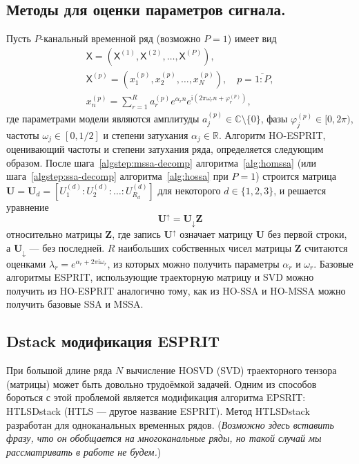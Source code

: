 \documentclass[12pt]{article}
\newcommand{\tX}{\mathsf{X}}
\newcommand{\iu}{\mathrm{i}}
\theoremstyle{definition}
\theoremstyle{remark}
\begin{document}
\subsection{Методы для оценки параметров сигнала.}
Пусть $P$-канальный временной ряд (возможно $P=1$) имеет вид
\begin{gather*}
  \tX = (\tX^{(1)}, \tX^{(2)}, \ldots, \tX^{(P)}),\\
  \tX^{(p)} = (x_1^{(p)}, x_2^{(p)}, \ldots, x_N^{(p)}), \quad
  p=\overline{1:P},\\
  x_n^{(p)}= \sum_{r=1}^{R} a_r^{(p)} e^{\alpha_r n} e^{\iu\left(2\pi
  \omega_r n + \varphi_r^{(p)}\right)},
\end{gather*}
где параметрами модели являются амплитуды $a_j^{(p)} \in
\mathbb{C}\setminus\{0\}$, фазы ${\varphi_j^{(p)} \in [0, 2\pi)}$,
частоты $\omega_j\in [0, 1/2]$ и степени затухания $\alpha_j \in \mathbb{R}$.
Алгоритм HO-ESPRIT, оценивающий частоты и степени затухания ряда,
определяется следующим образом.
После шага~\ref{algstep:mssa-decomp} алгоритма~\ref{alg:homssa} (или
шага~\ref{algstep:ssa-decomp} алгоритма~\ref{alg:hossa} при $P=1$)
строится матрица $\mathbf{U} = \mathbf{U}_d = \left[U_1^{(d)} :
U_2^{(d)}:\ldots : U_{R_d}^{(d)}\right]$ для некоторого $d\in \{1, 2,
3\}$, и решается уравнение
\begin{equation*}
  \mathbf{U}^{\uparrow}=\mathbf{U}_{\downarrow}\mathbf{Z}
\end{equation*}
относительно матрицы $\mathbf{Z}$, где запись $\mathbf{U}^{\uparrow}$ означает
матрицу $\mathbf{U}$ без первой строки, а $\mathbf{U}_{\downarrow}$
--- без последней.
$R$ наибольших собственных чисел матрицы $\mathbf{Z}$ считаются
оценками $\lambda_r = e^{\alpha_r + 2\pi\iu \omega_r}$, из которых
можно получить параметры $\alpha_r$ и $\omega_r$.
Базовые алгоритмы ESPRIT, использующие траекторную матрицу и SVD
можно получить из HO-ESPRIT аналогично тому, как из HO-SSA и HO-MSSA
можно получить базовые SSA и MSSA.


\subsection{Dstack модификация ESPRIT}
При большой длине ряда $N$ вычисление HOSVD (SVD) траекторного
тензора (матрицы) может быть довольно трудоёмкой задачей.
Одним из способов бороться с этой проблемой является модификация
алгоритма EPSRIT: HTLSDstack (HTLS --- другое название ESPRIT).
Метод HTLSDstack разработан для одноканальных временных рядов.
(\emph{Возможно здесь вставить фразу, что он обобщается на
многоканальные ряды, но такой случай мы рассматривать в работе не будем.})
\end{document}
